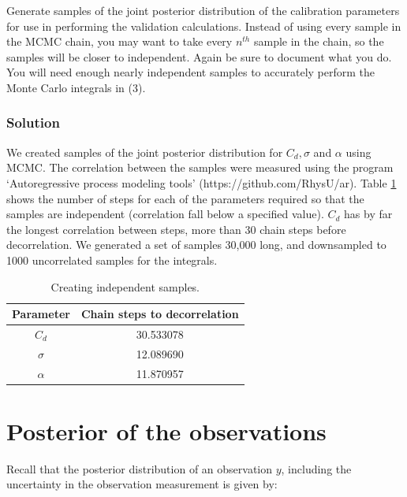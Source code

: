 \documentclass{article}
\providecommand{\tabularnewline}{\\}
\begin{document}
Generate samples of the joint posterior distribution of the calibration
parameters for use in performing the validation calculations. Instead
of using every sample in the MCMC chain, you may want to take every
$n^{th}$ sample in the chain, so the samples will be closer to independent.
Again be sure to document what you do. You will need enough nearly
independent samples to accurately perform the Monte Carlo integrals
in (3).


\subsubsection*{Solution}

We created samples of the joint posterior distribution for $C_{d},\sigma$
and $\alpha$ using MCMC. The correlation between the samples were
measured using the program `Autoregressive process modeling tools'
(https://github.com/RhysU/ar). Table \ref{table:creatingindesamples}
shows the number of steps for each of the parameters required so that
the samples are independent (correlation fall below a specified value).
$C_{d}$ has by far the longest correlation between steps, more than
30 chain steps before decorrelation. We generated a set of samples
30,000 long, and downsampled to 1000 uncorrelated samples for the
integrals.

\begin{table}
\begin{centering}
\begin{tabular}{|c|c|}
\hline 
Parameter & Chain steps to decorrelation\tabularnewline
\hline 
\hline 
$C_{d}$ & 30.533078\tabularnewline
\hline 
$\sigma$ & 12.089690\tabularnewline
\hline 
$\alpha$ & 11.870957\tabularnewline
\hline 
\end{tabular}
\par\end{centering}

\caption{Creating independent samples.}


\label{table:creatingindesamples}
\end{table}



\section{Posterior of the observations}

Recall that the posterior distribution of an observation $y$, including
the uncertainty in the observation measurement is given by:
\end{document}
